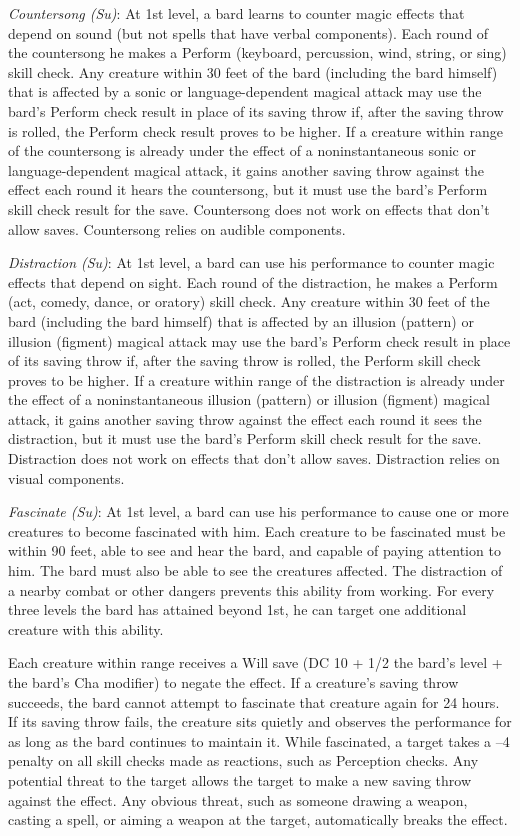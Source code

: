\textit{Countersong (Su)}: At 1st level, a bard learns to counter magic effects that depend on sound (but not spells that have verbal components). Each round of the countersong he makes a Perform (keyboard, percussion, wind, string, or sing) skill check. Any creature within 30 feet of the bard (including the bard himself) that is affected by a sonic or language-dependent magical attack may use the bard's Perform check result in place of its saving throw if, after the saving throw is rolled, the Perform check result proves to be higher. If a creature within range of the countersong is already under the effect of a noninstantaneous sonic or language-dependent magical attack, it gains another saving throw against the effect each round it hears the countersong, but it must use the bard's Perform skill check result for the save. Countersong does not work on effects that don't allow saves. Countersong relies on audible components.
				
\textit{Distraction (Su)}: At 1st level, a bard can use his performance to counter magic effects that depend on sight. Each round of the distraction, he makes a Perform (act, comedy, dance, or oratory) skill check. Any creature within 30 feet of the bard (including the bard himself) that is affected by an illusion (pattern) or illusion (figment) magical attack may use the bard's Perform check result in place of its saving throw if, after the saving throw is rolled, the Perform skill check proves to be higher. If a creature within range of the distraction is already under the effect of a noninstantaneous illusion (pattern) or illusion (figment) magical attack, it gains another saving throw against the effect each round it sees the distraction, but it must use the bard's Perform skill check result for the save. Distraction does not work on effects that don't allow saves. Distraction relies on visual components.
				
\textit{Fascinate (Su)}: At 1st level, a bard can use his performance to cause one or more creatures to become fascinated with him. Each creature to be fascinated must be within 90 feet, able to see and hear the bard, and capable of paying attention to him. The bard must also be able to see the creatures affected. The distraction of a nearby combat or other dangers prevents this ability from working. For every three levels the bard has attained beyond 1st, he can target one additional creature with this ability.
				
Each creature within range receives a Will save (DC 10 + 1/2 the bard's level + the bard's Cha modifier) to negate the effect. If a creature's saving throw succeeds, the bard cannot attempt to fascinate that creature again for 24 hours. If its saving throw fails, the creature sits quietly and observes the performance for as long as the bard continues to maintain it. While fascinated, a target takes a --4 penalty on all skill checks made as reactions, such as Perception checks. Any potential threat to the target allows the target to make a new saving throw against the effect. Any obvious threat, such as someone drawing a weapon, casting a spell, or aiming a weapon at the target, automatically breaks the effect.
				
